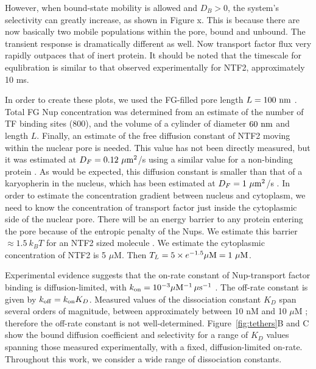 However, when bound-state mobility is allowed and $D_B > 0$, the system's selectivity can greatly increase, as shown in Figure x.  This is because there are now basically two mobile populations within the pore, bound and unbound.  The transient response is dramatically different as well.  Now transport factor flux very rapidly outpaces that of inert protein.  It should be noted that the timescale for equlibration is similar to that observed experimentally for NTF2, approximately 10 ms.

In order to create these plots, we used the FG-filled pore length $L = 100\ {\rm nm}$
\cite{frenkiel-krispin10, maimon12}.  Total FG Nup concentration was determined from an estimate of the number of TF binding sites ($800$), and the volume of a cylinder of diameter $60\ \nm$ and length $L$.  Finally, an estimate of the free diffusion constant of NTF2 moving within the nuclear pore is needed.  This value has not been directly measured, but it was estimated at $D_F = 0.12 \ \mu\mathrm{m}^2$/s using a similar value for a non-binding protein \cite{ribbeck01}.  As would be expected, this diffusion constant is smaller than that of a karyopherin in the nucleus, which has been estimated at $D_F =1 \ \mu\mathrm{m}^2$/s \cite{cardarelli10}.  In order to estimate the concentration gradient between nucleus and cytoplasm, we need to know the concentration of transport factor just inside the cytoplasmic side of the nuclear pore.  There will be an energy barrier to any protein entering the pore because of the entropic penalty of the Nups.  We estimate this barrier $\approx 1.5\ k_B T$ for an NTF2 sized molecule \cite{timney16}.  We estimate the cytoplasmic concentration of NTF2 is 5 $\mu$M.  Then $T_L= 5 \times e^{-1.5} \mu \mathrm{M} = 1 \mathrm{\ \mu M}$.  

Experimental evidence suggests that the on-rate constant of Nup-transport factor binding is diffusion-limited, with $k_{\rm on} = 10^{-3}\mu \mathrm{M}^{-1} \, \mu \mathrm{s}^{-1}$ \cite{milles15, hough15}.  The off-rate constant is given by $k_{\rm off} = k_{\rm on} K_D$.  Measured values of the dissociation constant $K_D$ span several orders of magnitude, between approximately between 10 nM and 10 $\mu$M \cite{pyhtila03, gilchrist02, tetenbaum-novatt12-1,
  milles15, timney16, vovk16}; therefore the off-rate constant is not well-determined.  Figure~\ref{fig:tethers}B and C show the bound diffusion coefficient and selectivity for a range of $K_D$ values spanning those measured experimentally, with a fixed, diffusion-limited on-rate.  Throughout this work, we consider a wide range of dissociation constants.


